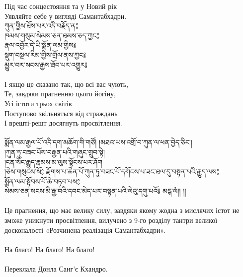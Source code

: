 Під час сонцестояння та у Новий рік \\
Уявляйте себе у вигляді Самантабхадри. \\
\newpage
{\ti
ཀུན་གྱིས་ཐོས་པར་འདི་བརྗོད་ན༔ \\
ཁམས་གསུམ་སེམས་ཅན་ཐམས་ཅད་ཀྱང༔ \\
རྣལ་འབྱོར་དེ་ཡི་སྨོན་ལམ་གྱིས༔ \\
སྡུག་བསྔལ་རིམ་གྱིས་གྲོལ་ནས་ཀྱང༔ \\
མྱུར་བར་སངས་རྒྱས་ཐོབ་པར་འགྱུར༔}\\
\\
І якщо це сказано так, що всі вас чують, \\
Те, завдяки прагненню цього йогіну, \\
Усі істоти трьох світів \\
Поступово звільняться від страждань \\
І врешті-решт досягнуть просвітлення. \\
\\
{\ti
སྨོན་ལམ་རྒྱལ་པོ་འདི་དག་མཆོག་གི་གཙོ། །མཐའ་ཡས་འགྲོ་བ་ཀུན་ལ་ཕན་བྱེད་ཅིང་།\\
།ཀུན་ཏུ་བཟང་པོས་བརྒྱན་པའི་གཞུང་གྲུབ་སྟེ།\\
།ངན་སོང་རྒྱུད་རྣམས་མ་ལུས་སྟོངས་པར་ཤོག \\
།ཅེས་གསུངས་སོ༔ རྫོགས་པ་ཆེན་པོ་ཀུན་ཏུ་བཟང་པོ་དགོངས་པ་ཟང་ཐལ་དུ་བསྟན་པའི་རྒྱུད་ལས༔\\
སྨོན་ལམ་སྟོབས་པོ་ཆེ་བཏབ་པས༔\\
སེམས་ཅན་སངས་མི་རྒྱ་བའི་དབང་མེད་པར་བསྟན་པའི་ལེའུ་དགུ་པའོ༔ མངྒ་ལཾ།། །།}\\
\\
\scriptsize
Це прагнення, що має велику силу, завдяки якому
жодна з мислячих істот не зможе уникнути просвітлення,
вилучено з 9-го розділу тантри великої досконалості «Розчинена
реалізація Самантабхадри».\\
\\
На благо! На благо! На благо!\\
\\
Переклала Донла Санг'є Кхандро.
\normalsize
